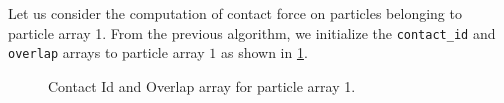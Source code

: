 Let us consider the computation of contact force on particles belonging to
particle array 1. From the previous algorithm, we initialize the
\texttt{contact\_id} and \texttt{overlap} arrays to particle array $1$ as shown
in \cref{fig:mb-2-pa-prev-algo}.
\begin{figure}[!htpb]
  \centering
  \caption{Contact Id and Overlap array for particle array 1.}
\label{fig:mb-2-pa-prev-algo}
\end{figure}

